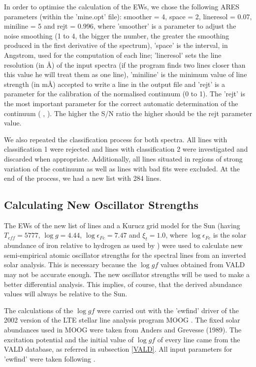 \documentclass[dvips,12pt,a4paper]{report}
\begin{document}
{In order to optimise the calculation of the EWs, we chose the following ARES parameters (within the 'mine.opt' file): smoother = 4, space = 2, lineresol = 0.07, miniline = 5 and rejt = 0.996, where 'smoother' is a parameter to adjust the noise smoothing (1 to 4, the bigger the number, the greater the smoothing produced in the first derivative of the spectrum), 'space' is the interval, in Angstrom, used for the computation of each line; 'lineresol' sets the line resolution (in \AA) of the input spectra (if the program finds two lines closer than this value he will treat them as one line),  'miniline' is the minimum value of line strength (in m\AA{}) accepted to write a line in the output file and 'rejt' is a parameter for the calibration of the normalised continuum (0 to 1). The 'rejt' is the most important parameter for the correct automatic determination of the continuum (\citeauthor{Sousa-2007} \citeyear{Sousa-2007}, \citeauthor{Sousa-2008} \citeyear{Sousa-2008}). The higher the S/N ratio the higher should be the rejt parameter value.

We also repeated the classification process for both spectra. All lines with classification 1 were rejected and lines with classification 2 were investigated and discarded when appropriate. Additionally, all lines situated in regions of strong variation of the continuum as well as lines with bad fits were excluded. At the end of the process, we had a new list with 284 lines.

\subsection {Calculating New Oscillator Strengths}
\label{newloggf}
The EWs of the new list of lines and a Kurucz grid model for the Sun \citep{Kurucz-1993} (having $T_{eff}=5777$, $\log g=4.44$, $\log\epsilon_{Fe}=7.47$ and $\xi_t=1.0$, where $\log\epsilon_{Fe}$ is the solar abundance of iron relative to hydrogen as used by \citeauthor{Santos-2004b} \citeyear{Santos-2004b}) were used to calculate new semi-empirical atomic oscillator strengths for the spectral lines from an inverted solar analysis. This is necessary because the $\log gf$ values obtained from VALD may not be accurate enough. The new oscillator strengths will be used to make a better differential analysis. This implies, of course, that the derived abundance values will always be relative to the Sun.

The calculations of the $\log gf$ were carried out with the 'ewfind' driver of the 2002 version of the LTE stellar line analysis program MOOG \citep{Sneden-1973}. The fixed solar abundances used in MOOG were taken from Anders and Grevesse (1989). The excitation potential and the initial value of $\log gf$ of every line came from the VALD database, as referred in subsection \ref{VALD}. All input parameters for 'ewfind' were taken following \citet{Santos-2004b}.


}
\end{document}
